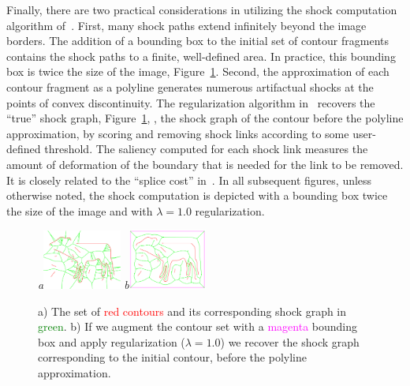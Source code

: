 



 


Finally, there are two practical considerations in utilizing the shock computation algorithm of~\cite{Tamrakar:Kimia:Shock}. First, many shock paths extend infinitely beyond the image borders. The addition of a bounding box to the initial set of contour fragments contains the shock paths to a finite, well-defined area. In practice, this bounding box is twice the size of the image, Figure~\ref{fig:shocks_regular}. Second, the approximation of each contour fragment as a polyline generates numerous artifactual shocks at the points of convex discontinuity. The regularization algorithm in~\cite{Tamrakar:Kimia:Shock} recovers the ``true'' shock graph, Figure~\ref{fig:shocks_regular}, \ie, the shock graph of the contour before the polyline approximation, by scoring and removing shock links according to some user-defined threshold. The saliency computed for each shock link measures the amount of deformation of the boundary that is needed for the link to be removed. It is closely related to the ``splice cost'' in~\cite{Sebastian:etal:Shocks:PAMI2004}. In all subsequent figures, unless otherwise noted, the shock computation is depicted with a bounding box twice the size of the image and with $\lambda=1.0$ regularization.  

\begin{figure}[ht]
\centering
{\footnotesize\textit{a}}\includegraphics[width=0.23\textwidth]{figs/calf_nobbox_noreg.pdf}
{\footnotesize\textit{b}}\includegraphics[width=0.23\textwidth]{figs/calf_bbox_reg.pdf}
\caption{a) The set of \textcolor{red}{red contours} and its corresponding shock graph in \textcolor{green}{green}. b) If we augment the contour set with a \textcolor{magenta}{magenta} bounding box and apply regularization ($\lambda=1.0$) we recover the shock graph corresponding to the initial contour, before the polyline approximation. }
\label{fig:shocks_regular}
\end{figure}



